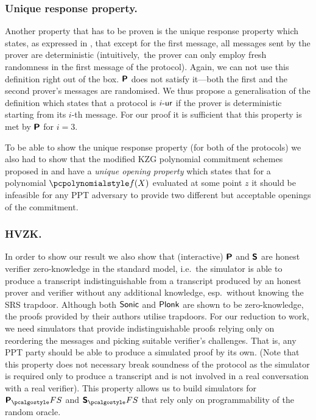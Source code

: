 \documentclass[runningheads,11pt]{llncs}
\theoremstyle{definition} \newtheorem{definition}[theorem]{Definition}
\begin{document}
\subsubsection{Unique response property.} Another property that has to be proven
is the unique response property which states, as expressed in
\cite{C:Fischlin05}, that except for the first message, all messages sent by the
prover are deterministic (intuitively,~the prover can only employ fresh randomness
in the first message of the protocol). Again, we can not use this
definition right out of the box. $\bm{\mathsf{P}}$ does not satisfy
it---both the first and the second prover's messages are randomised. We thus propose
a generalisation of the definition which states that a protocol is ${i\text{-}\mathsf{ur}}$ if
the prover is deterministic starting from its $i$-th message. For our proof it is sufficient that this property is met by $\bm{\mathsf{P}}$ for $i = 3$.

To be able to show the unique response property (for both of the protocols) we
also had to show that the modified KZG polynomial commitment schemes
\cite{AC:KatZavGol10} proposed in \cite{EPRINT:GabWilCio19} and
\cite{CCS:MBKM19} have a \emph{unique opening property} which states that for a
polynomial $\p{f}(X)$ evaluated at some point $z$ it should be infeasible for
any PPT adversary to provide two different but acceptable openings
of the commitment.

\subsubsection{HVZK.}%
In order to show our result we also show that (interactive) $\bm{\mathsf{P}}$ and
$\bm{\mathsf{S}}$ are honest verifier zero-knowledge in the standard model, i.e.~the
simulator is able to produce a transcript indistinguishable from a transcript
produced by an honest prover and verifier without any additional knowledge,
esp.~without knowing the SRS trapdoor. Although both ${\textnormal{\textsf{Sonic}}}$ and $\textnormal{\textsf{Plonk}}$ are
shown to be zero-knowledge, the proofs provided by their authors utilise
trapdoors. For our reduction to work, we need simulators that provide
indistinguishable proofs relying only on reordering the messages
and picking suitable verifier's challenges. That is, any PPT party should be
able to produce a simulated proof by its own. (Note that this property does not
necessary break soundness of the protocol as the simulator is required only to
produce a transcript and is not involved in a real conversation with a real
verifier). This property allows us to build simulators for $\plonkprotfs$ and
$\sonicprotfs$ that rely only on programmability of the random oracle.
\end{document}

